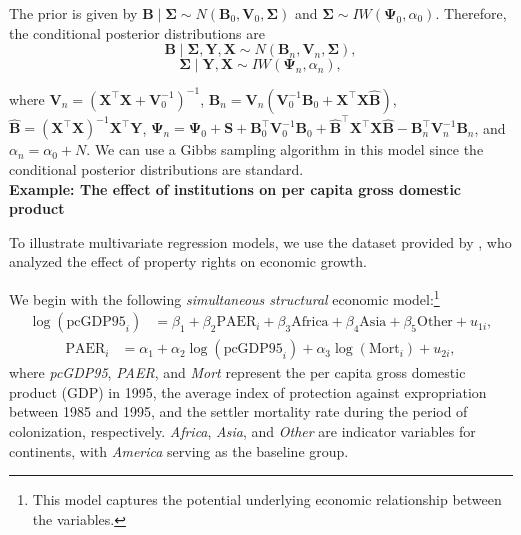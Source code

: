 The prior is given by $\bm{B}\mid\bm{\Sigma}\sim{N}(\bm{B}_0,\bm{V}_0, \bm{\Sigma})$ and $\bm{\Sigma}\sim{I}{W}(\bm{\Psi}_0,\alpha_0)$. Therefore, the conditional posterior distributions are
\begin{equation*}
	\bm{B}\mid\bm{\Sigma}, \bm{Y}, \bm{X} \sim{N}(\bm{B}_n, \bm{V}_n, \bm{\Sigma}), 
\end{equation*}
\begin{equation*}
	\bm{\Sigma}\mid \bm{Y}, \bm{X} \sim {I}{W}(\bm{\Psi}_n, \alpha_n),
\end{equation*}

where $\bm{V}_n=(\bm{X}^{\top}\bm{X}+\bm{V}_0^{-1})^{-1}$, $\bm{B}_n=\bm{V}_n(\bm{V}_0^{-1}\bm{B}_0 + \bm{X}^{\top}\bm{X}\hat{\bm{B}})$, $\hat{\bm{B}}=(\bm{X}^{\top}\bm{X})^{-1}\bm{X}^{\top}\bm{Y}$, $\bm{\Psi}_n = {\bm{\Psi}}_{0}+{\bm{S}}+{\bm{B}}_{0}^{\top}{\bm{V}}_{0}^{-1}{\bm{B}}_{0}+\widehat{\bm{B}}^{\top}{\bm{X}}^{\top}{\bm{X}}\widehat{\bm{B}}-{\bm{B}}_n^{\top}{\bm{V}}_n^{-1}{\bm{B}}_n$, and $\alpha_n = \alpha_0 + N$. We can use a Gibbs sampling algorithm in this model since the conditional posterior distributions are standard.\\

\textbf{Example: The effect of institutions on per capita gross domestic product}

To illustrate multivariate regression models, we use the dataset provided by \cite{Acemoglu2001}, who analyzed the effect of property rights on economic growth.

We begin with the following \textit{simultaneous structural} economic model:\footnote{This model captures the potential underlying economic relationship between the variables.}
\begin{align}\label{eq:str1}
	\log(\text{pcGDP95}_i) &= \beta_1 + \beta_2 \text{PAER}_i + \beta_3 \text{Africa} + \beta_4 \text{Asia} + \beta_5 \text{Other} + u_{1i},
\end{align}
\begin{align}\label{eq:str2}
	\text{PAER}_i &= \alpha_1 + \alpha_2 \log(\text{pcGDP95}_i) + \alpha_3 \log(\text{Mort}_i) + u_{2i},
\end{align}
where \textit{pcGDP95}, \textit{PAER}, and \textit{Mort} represent the per capita gross domestic product (GDP) in 1995, the average index of protection against expropriation between 1985 and 1995, and the settler mortality rate during the period of colonization, respectively. \textit{Africa}, \textit{Asia}, and \textit{Other} are indicator variables for continents, with \textit{America} serving as the baseline group.

